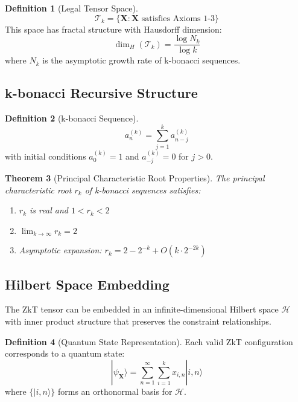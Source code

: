 \documentclass[12pt]{article}
\theoremstyle{plain}
\newtheorem{theorem}{Theorem}[section]
\theoremstyle{definition}
\newtheorem{definition}[theorem]{Definition}
\newcommand{\cH}{\mathcal{H}}
\newcommand{\cT}{\mathcal{T}}
\begin{document}
\begin{definition}[Legal Tensor Space]
\begin{equation}
\cT_k = \{\mathbf{X} : \mathbf{X} \text{ satisfies Axioms 1-3}\}
\end{equation}
This space has fractal structure with Hausdorff dimension:
\begin{equation}
\dim_H(\cT_k) = \frac{\log N_k}{\log k}
\end{equation}
where $N_k$ is the asymptotic growth rate of k-bonacci sequences.
\end{definition}

\subsection{k-bonacci Recursive Structure}

\begin{definition}[k-bonacci Sequence]
\begin{equation}
a_n^{(k)} = \sum_{j=1}^{k} a_{n-j}^{(k)}
\end{equation}
with initial conditions $a_0^{(k)} = 1$ and $a_{-j}^{(k)} = 0$ for $j > 0$.
\end{definition}

\begin{theorem}[Principal Characteristic Root Properties]
The principal characteristic root $r_k$ of k-bonacci sequences satisfies:
\begin{enumerate}
\item $r_k$ is real and $1 < r_k < 2$
\item $\lim_{k \to \infty} r_k = 2$
\item Asymptotic expansion: $r_k = 2 - 2^{-k} + O(k \cdot 2^{-2k})$
\end{enumerate}
\end{theorem}

\subsection{Hilbert Space Embedding}

The ZkT tensor can be embedded in an infinite-dimensional Hilbert space $\cH$ with inner product structure that preserves the constraint relationships.

\begin{definition}[Quantum State Representation]
Each valid ZkT configuration corresponds to a quantum state:
\begin{equation}
|\psi_{\mathbf{X}}\rangle = \sum_{n=1}^{\infty} \sum_{i=1}^k x_{i,n} |i,n\rangle
\end{equation}
where $\{|i,n\rangle\}$ forms an orthonormal basis for $\cH$.
\end{definition}
\end{document}
